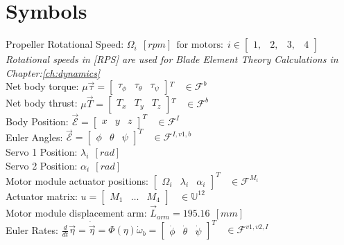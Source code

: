 \documentclass[a4paper, 11pt, oneside, openright, parskip=full]{book}
\begin{document}
\chapter{Symbols}
\label{ch:symbol}
Propeller Rotational Speed: $\Omega_i~~[rpm]~~\text{for motors:}~~i\in\begin{bmatrix}
1,&2,&3,&4
\end{bmatrix}$
\\
\emph{\color{Gray} Rotational speeds in [RPS] are used for Blade Element Theory Calculations in Chapter:\ref{ch:dynamics}}
\\
Net body torque: $\mu\vec{\tau}=\begin{bmatrix}
\tau_\phi & \tau_\theta & \tau_\psi
\end{bmatrix}\text{}^T~~~~\in\mathcal{F}^b$
\\
Net body thrust: $\mu\vec{T}=\begin{bmatrix}
T_x & T_y & T_z
\end{bmatrix}\text{}^T~~~~\in\mathcal{F}^b$
\\
Body Position: $\vec{\mathcal{E}}=\begin{bmatrix}
x & y & z
\end{bmatrix}^T~~~~\in\mathcal{F}^I$
\\
Euler Angles: $\vec{\mathcal{E}}=\begin{bmatrix}
\phi & \theta & \psi
\end{bmatrix}^T~~~~\in\mathcal{F}^{I,v1,b}$
\\
Servo 1 Position: $\lambda_i~~[rad]$
\\
Servo 2 Position: $\alpha_i~~[rad]$
\\
Motor module actuator positions: $\begin{bmatrix}
\Omega_i & \lambda_i & \alpha_i
\end{bmatrix}^T~~~~\in\mathcal{F}^{M_i}$
\\
Actuator matrix: $u=\begin{bmatrix}
M_1 & \ldots & M_4
\end{bmatrix}~~~~\in\mathbb{U}^{12}$
\\
Motor module displacement arm: $\vec{L}_{arm}=195.16~~[mm]$
\\
Euler Rates: $\frac{d}{dt}\vec{\eta}=\dot{\vec{\eta}}=\Phi(\eta)\dot{\omega}_b=\begin{bmatrix}
\dot{\phi} & \dot{\theta} & \dot{\psi}
\end{bmatrix}^T~~~~\in\mathcal{F}^{v1,v2,I}$
\end{document}
